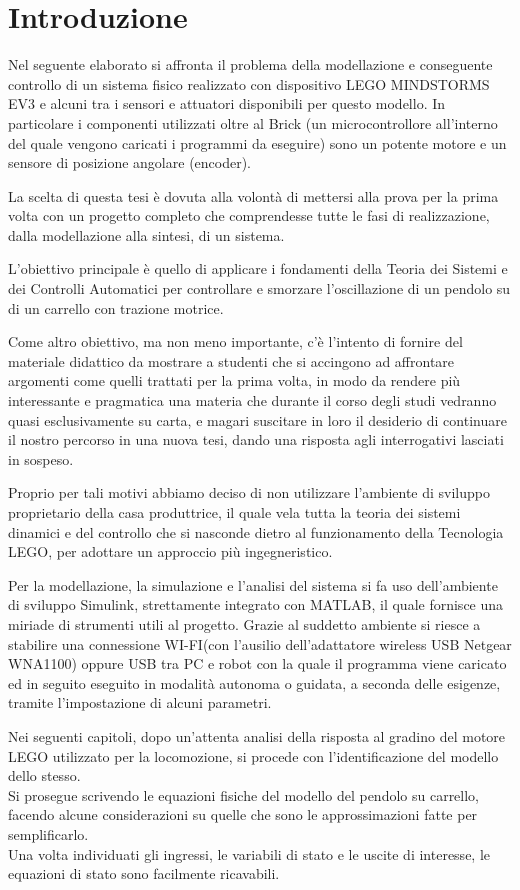 \chapter{Introduzione}
Nel seguente elaborato si affronta il problema della modellazione e conseguente controllo di un sistema fisico realizzato con dispositivo LEGO MINDSTORMS EV3 e alcuni tra i sensori e attuatori disponibili per questo modello.
In particolare i componenti utilizzati oltre al Brick (un microcontrollore all'interno del quale vengono caricati i programmi da eseguire) sono un potente motore e un sensore di posizione angolare (encoder).

La scelta di questa tesi è dovuta alla volontà di mettersi alla prova per la prima volta con un progetto completo che comprendesse tutte le fasi di realizzazione, dalla modellazione alla sintesi, di un sistema.

L'obiettivo principale è quello di applicare i fondamenti della Teoria dei Sistemi e dei Controlli Automatici per controllare e smorzare l'oscillazione di un pendolo su di un carrello con trazione motrice.

Come altro obiettivo, ma non meno importante, c'è l'intento di fornire del materiale didattico da mostrare a studenti che si accingono ad affrontare argomenti come quelli trattati per la prima volta, in modo da rendere più interessante e pragmatica una materia che durante il corso degli studi vedranno quasi esclusivamente su carta, e magari suscitare in loro il desiderio di continuare il nostro percorso in una nuova tesi, dando una risposta agli interrogativi lasciati in sospeso. 

Proprio per tali motivi abbiamo deciso di non utilizzare l'ambiente di sviluppo proprietario della casa produttrice, il quale vela tutta la teoria dei sistemi dinamici e del controllo che si nasconde dietro al funzionamento della Tecnologia LEGO, per adottare un approccio più ingegneristico.

Per la modellazione, la simulazione e l'analisi del sistema si fa uso dell'ambiente di sviluppo Simulink, strettamente integrato con MATLAB, il quale fornisce una miriade di strumenti utili al progetto.
Grazie al suddetto ambiente si riesce a stabilire una connessione WI-FI(con l'ausilio dell'adattatore wireless USB Netgear WNA1100) oppure USB tra PC e robot con la quale il programma viene caricato ed in seguito eseguito in modalità autonoma o guidata, a seconda delle esigenze, tramite l'impostazione di alcuni parametri.

Nei seguenti capitoli, dopo un'attenta analisi della risposta al gradino del motore LEGO utilizzato per la locomozione, si procede con l'identificazione del modello dello stesso.\\
Si prosegue scrivendo le equazioni fisiche del modello del pendolo su carrello, facendo alcune considerazioni su quelle che sono le approssimazioni fatte per semplificarlo.\\
Una volta individuati gli ingressi, le variabili di stato e le uscite di interesse, le equazioni di stato sono facilmente ricavabili.

